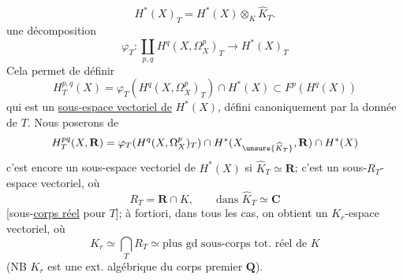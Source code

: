 \[
 H^*(X)_T=H^*(X)\otimes_K\widehat K_T.
\]
une décomposition
\[
 \boxed{\varphi_T:\coprod_{p,q}H^q(X,\Omega_X^p)_T\longrightarrow H^*(X)_T}
\]
Cela permet de définir
\[
 H_T^{p,q}(X)=\varphi_T(H^q(X,\Omega_X^p)_T)\cap H^*(X)\subset F^p(H^q(X))
\]
qui est un \uline{sous-espace vectoriel de} $H^*(X)$, défini canoniquement par la donnée de $T$. Nous poserons de \unsure{$=$}
\[
 H_T^{pq}(X,\mathbf R)=\varphi_T(H^q(X,\Omega_X^p)_T)\cap H^*(X_{\unsure{\widehat K_T}},\mathbf R)\cap H^*(X)
\]
c'est encore un sous-espace vectoriel de $H^*(X)$ si $\widehat K_T\simeq\mathbf R$;   c'est un sous-$R_T$-espace vectoriel, où
\[
 R_T=\mathbf R\cap K,\qquad\text{dans }\widehat K_T\simeq\mathbf C
\]
[sous-\uline{corps réel} pour $T$]; à fortiori,  dans tous les cas, on obtient un $K_r$-espace vectoriel, où
\[
 K_r\simeq\bigcap_T R_T\simeq\text{plus gd sous-corps tot. réel de }K
\]
(NB $K_r$ est une ext. algébrique du corps premier $\mathbf Q$).
